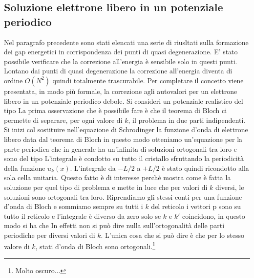 \documentclass[a4paper,12pt]{article}
\begin{document}
\subsection{Soluzione elettrone libero in un potenziale periodico}
Nel paragrafo precedente sono stati elencati una serie di riusltati sulla formazione dei gap energetici in corrispondenza dei punti di quasi degenerazione. E' stato possibile verificare che la correzione all'energia è sensibile solo in questi punti. Lontano dai punti di quasi degenerazione la correzione all'energia diventa di ordine $O(N^2)$ quindi totalmente trascurabile. Per completare il concetto viene presentata, in modo più formale, la correzione agli autovalori per un elettrone libero in un potenziale periodico debole. Si consideri un potenziale realistico del tipo
La prima osservazione che è possibile fare è che il teorema di Bloch ci permette di separare, per ogni valore di $k$, il problema in due parti indipendenti. Si inizi col sostituire nell'equazione di Schrodinger la funzione d'onda di elettrone libero data dal teorema di Bloch
in questo modo otteniamo un'equazione per la parte periodica
che in generale ha un'infinita di soluzioni ortogonali tra loro e sono del tipo
L'integrale è condotto su tutto il cristallo sfruttando la periodicità della funzione $u_k(x)$. L'integrale da $-L/2$ a $+L/2$ è stato quindi ricondotto alla sola cella unitaria.
Questo fatto è di interesse perchè mostra come è fatta la soluzione per quel tipo di problema e mette in luce che per valori di $k$ diversi, le soluzioni sono ortogonali tra loro. Riprendiamo gli stessi conti per una funzione d'onda di Bloch e sommiamo sempre su tutti i $k$ del reticolo
i vettori p sono su tutto il reticolo e l'integrale è diverso da zero solo se $k$ e $k'$ coincidono, in questo modo si ha che
In effetti non si può dire nulla sull'ortogonalità delle parti periodiche per diversi valori di $k$. L'unica cosa che si può dire è che per lo stesso valore di $k$, stati d'onda  di Bloch sono ortogonali.\footnote{Molto oscuro...}
\end{document}
